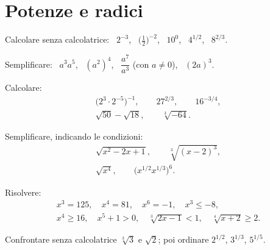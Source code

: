 \section{Potenze e radici}

\begin{esercizio}[\liv{1}]
Calcolare senza calcolatrice: \ $2^{-3}$, \ $\bigl(\tfrac12\bigr)^{-2}$, \ $10^{0}$, \ $4^{1/2}$, \ $8^{2/3}$.
\end{esercizio}

\begin{esercizio}[\liv{1}]
Semplificare: \ $a^3a^5$, \ $(a^2)^4$, \ $\dfrac{a^7}{a^3}$ (con $a\ne0$), \ $(2a)^3$.
\end{esercizio}

\begin{esercizio}[\liv{1}]
Calcolare:
\begin{gather*}
\bigl(2^3\cdot2^{-5}\bigr)^{-1},\qquad 27^{2/3},\qquad 16^{-3/4},\\
\sqrt{50}-\sqrt{18},\qquad \sqrt[3]{-64} .
\end{gather*}
\end{esercizio}

\begin{esercizio}[\liv{2}]
Semplificare, indicando le condizioni:
\begin{gather*}
\sqrt{x^2-2x+1},\qquad \sqrt[3]{(x-2)^3},\\
\sqrt{x^4},\qquad \bigl(x^{1/2}x^{1/3}\bigr)^6 .
\end{gather*}
\end{esercizio}

\begin{esercizio}[\liv{2}]
Risolvere:
\begin{gather*}
x^3=125,\quad x^4=81,\quad x^6=-1,\quad x^3\le-8,\\
x^4\ge16,\quad x^5+1>0,\quad \sqrt[3]{2x-1}<1,\quad \sqrt[4]{x+2}\ge2 .
\end{gather*}
\end{esercizio}

\begin{esercizio}[\liv{3}]
Confrontare senza calcolatrice $\sqrt[3]{3}$ e $\sqrt2$; poi ordinare $2^{1/2}$, $3^{1/3}$, $5^{1/5}$.
\end{esercizio}

